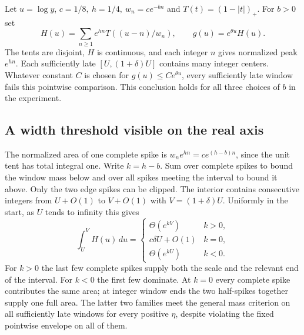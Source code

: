 \documentclass[12pt,letterpaper]{article}
\begin{document}
Let \(u=\log y\), \(c=1/8,\ h=1/4,\ w_n=c e^{-bn}\) and \(T(t)=(1-|t|)_+\). For \(b>0\) set
\[
 H(u)=\sum_{n\ge1}e^{hn}T((u-n)/w_n),\qquad g(u)=e^{\theta u}H(u).
\]
The tents are disjoint, \(H\) is continuous, and each integer \(n\) gives normalized peak \(e^{hn}\). Each sufficiently late \([U,(1+\delta)U]\) contains many integer centers. Whatever constant \(C\) is chosen for \(g(u)\le C e^{\theta u}\), every sufficiently late window fails this pointwise comparison. This conclusion holds for all three choices of \(b\) in the experiment.

\subsection{A width threshold visible on the real axis}
The normalized area of one complete spike is \(w_ne^{hn}=c e^{(h-b)n}\), since the unit tent has total integral one. Write \(k=h-b\). Sum over complete spikes to bound the window mass below and over all spikes meeting the interval to bound it above. Only the two edge spikes can be clipped. The interior contains consecutive integers from \(U+O(1)\) to \(V+O(1)\) with \(V=(1+\delta)U\). Uniformly in the start, as \(U\) tends to infinity this gives
\[
   \int_U^V H(u)\,du=
       \begin{cases}
         \Theta(e^{kV}) & k>0,\\
         c\delta U+O(1) & k=0,\\
         \Theta(e^{kU}) & k<0 .
       \end{cases}
\]
For \(k>0\) the last few complete spikes supply both the scale and the relevant end of the interval. For \(k<0\) the first few dominate. At \(k=0\) every complete spike contributes the same area; at integer window ends the two half-spikes together supply one full area. The latter two families meet the general mass criterion on all sufficiently late windows for every positive \(\eta\), despite violating the fixed pointwise envelope on all of them.
\end{document}
